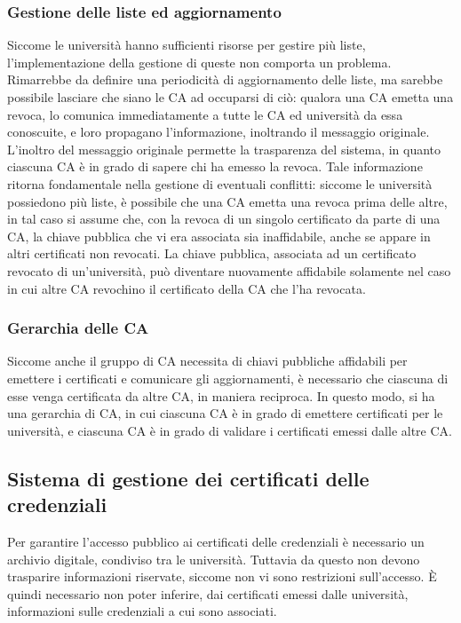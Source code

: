 \documentclass[a4paper,12pt]{article}
\begin{document}
\subsubsection{Gestione delle liste ed aggiornamento} Siccome le università hanno sufficienti risorse per gestire più liste, l'implementazione della gestione di queste non comporta un problema. Rimarrebbe da definire una periodicità di aggiornamento delle liste, ma sarebbe possibile lasciare che siano le CA ad occuparsi di ciò: qualora una CA emetta una revoca, lo comunica immediatamente a tutte le CA ed università da essa conoscuite, e loro propagano l'informazione, inoltrando il messaggio originale.
\newline L'inoltro del messaggio originale permette la trasparenza del sistema, in quanto ciascuna CA è in grado di sapere chi ha emesso la revoca. Tale informazione ritorna fondamentale nella gestione di eventuali conflitti: siccome le università possiedono più liste, è possibile che una CA emetta una revoca prima delle altre, in tal caso si assume che, con la revoca di un singolo certificato da parte di una CA, la chiave pubblica che vi era associata sia inaffidabile, anche se appare in altri certificati non revocati. La chiave pubblica, associata ad un certificato revocato di un'università, può diventare nuovamente affidabile solamente nel caso in cui altre CA revochino il certificato della CA che l'ha revocata.
\subsubsection{Gerarchia delle CA} Siccome anche il gruppo di CA necessita di chiavi pubbliche affidabili per emettere i certificati e comunicare gli aggiornamenti, è necessario che ciascuna di esse venga certificata da altre CA, in maniera reciproca. In questo modo, si ha una gerarchia di CA, in cui ciascuna CA è in grado di emettere certificati per le università, e ciascuna CA è in grado di validare i certificati emessi dalle altre CA.

\subsection{Sistema di gestione dei certificati delle credenziali}
Per garantire l'accesso pubblico ai certificati delle credenziali è necessario un archivio digitale, condiviso tra le università. Tuttavia da questo non devono trasparire informazioni riservate, siccome non vi sono restrizioni sull'accesso. È quindi necessario non poter inferire, dai certificati emessi dalle università, informazioni sulle credenziali a cui sono associati.
\end{document}
